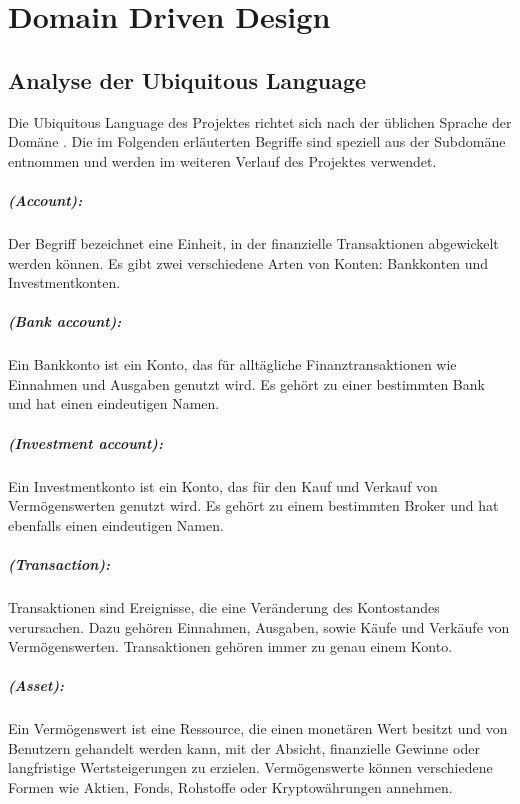 \chapter{Domain Driven Design}
\section{Analyse der Ubiquitous Language}

Die Ubiquitous Language des Projektes richtet sich nach der üblichen Sprache der Domäne . Die im Folgenden erläuterten Begriffe sind speziell aus der Subdomäne  entnommen und werden im weiteren Verlauf des Projektes verwendet.

\paragraph*{ (Account):} Der Begriff bezeichnet eine Einheit, in der finanzielle Transaktionen abgewickelt werden können. Es gibt zwei verschiedene Arten von Konten: Bankkonten und Investmentkonten.

\paragraph*{ (Bank account):} Ein Bankkonto ist ein Konto, das für alltägliche Finanztransaktionen wie Einnahmen und Ausgaben genutzt wird. Es gehört zu einer bestimmten Bank und hat einen eindeutigen Namen.

\paragraph*{ (Investment account):}  Ein Investmentkonto ist ein Konto, das für den Kauf und Verkauf von Vermögenswerten genutzt wird. Es gehört zu einem bestimmten Broker und hat ebenfalls einen eindeutigen Namen.

\paragraph*{ (Transaction):} Transaktionen sind Ereignisse, die eine Veränderung des Kontostandes verursachen. Dazu gehören Einnahmen, Ausgaben, sowie Käufe und Verkäufe von Vermögenswerten. Transaktionen gehören immer zu genau einem Konto.

\paragraph*{ (Asset):} Ein Vermögenswert ist eine Ressource, die einen monetären Wert besitzt und von Benutzern gehandelt werden kann, mit der Absicht, finanzielle Gewinne oder langfristige Wertsteigerungen zu erzielen. Vermögenswerte können verschiedene Formen wie Aktien, Fonds, Rohstoffe oder Kryptowährungen annehmen.

